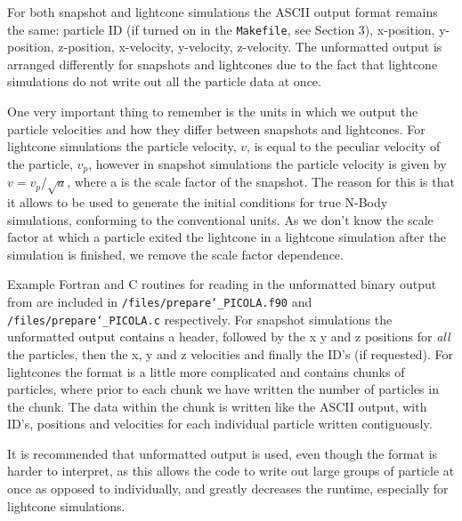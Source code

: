 \documentclass[12pt,twoside,a4paper]{article}
\begin{document}
For both snapshot and lightcone simulations the ASCII output format remains the same: particle ID (if turned on in the \texttt{Makefile}, see Section 3), x-position, y-position, z-position, x-velocity, y-velocity, z-velocity. The unformatted output is arranged differently for snapshots and lightcones due to the fact that lightcone simulations do not write out all the particle data at once.

One very important thing to remember is the units in which we output the particle velocities and how they differ between snapshots and lightcones. For lightcone simulations the particle velocity, $v$, is equal to the peculiar velocity of the particle, $v_{p}$, however in snapshot simulations the particle velocity is given by $v = v_{p}/\sqrt{a}$, where a is the scale factor of the snapshot. The reason for this is that it allows {\PICOLA} to be used to generate the initial conditions for true N-Body simulations, conforming to the conventional units. As we don't know the scale factor at which a particle exited the lightcone in a lightcone simulation after the simulation is finished, we remove the scale factor dependence.

Example Fortran and C routines for reading in the unformatted binary output from {\PICOLA} are included in \texttt{/files/prepare\char`_PICOLA.f90}  and \texttt{/files/prepare\char`_PICOLA.c} respectively. For snapshot simulations the unformatted output contains a header, followed by the x y and z positions for \emph{all} the particles, then the x, y and z velocities and finally the ID's (if requested). For lightcones the format is a little more complicated and contains chunks of particles, where prior to each chunk we have written the number of particles in the chunk. The data within the chunk is written like the ASCII output, with ID's, positions and velocities for each individual particle written contiguously.

It is recommended that unformatted output is used, even though the format is harder to interpret, as this allows the code to write out large groups of particle at once as opposed to individually, and greatly decreases the runtime, especially for lightcone simulations.
\end{document}
